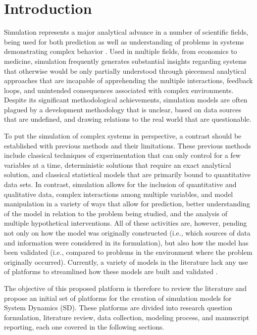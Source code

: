 \documentclass[11pt]{article}
\begin{document}
\newpage

\section{Introduction}

Simulation represents a major analytical advance in a number of scientific fields, being used for both prediction as well as understanding of problems in systems demonstrating complex behavior \cite{Giere2009}. Used in multiple fields, from economics to medicine, simulation frequently generates substantial insights regarding systems that otherwise would be only partially understood through piecemeal analytical approaches that are incapable of apprehending the multiple interactions, feedback loops, and unintended consequences associated with complex environments.  Despite its significant methodological achievements, simulation models are often plagued by a development methodology that is unclear, based on data sources that are undefined, and drawing relations to the real world that are questionable.
	
To put the simulation of complex systems in perspective, a contrast should be established with previous methods and their limitations.  These previous methods include classical techniques of experimentation that can only control for a few variables at a time, deterministic solutions that require an exact analytical solution, and classical statistical models that are primarily bound to quantitative data sets. In contrast, simulation allows for the inclusion of quantitative and qualitative data, complex interactions among multiple variables, and model manipulation in a variety of ways that allow for prediction, better understanding of the model in relation to the problem being studied, and the analysis of multiple hypothetical interventions.  All of these activities are, however, pending not only on how the model was originally constructed (i.e., which sources of data and information were considered in its formulation), but also how the model has been validated (i.e., compared to problems in the environment where the problem originally occurred).  Currently, a variety of models in the literature lack any use of platforms to streamlined how these models are built and validated \cite{Rand2006}.

The objective of this proposed platform is therefore to review the literature and propose an initial set of platforms for the creation of simulation models for System Dynamics (SD).  These platforms are divided into research question formulation, literature review, data collection, modeling process, and manuscript reporting, each one covered in the following sections.
\end{document}
